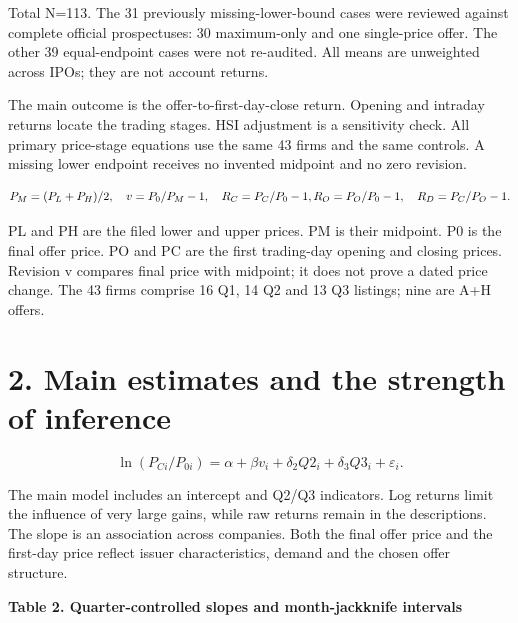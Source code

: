 \documentclass[10pt,a4paper]{article}
\begin{document}
{\footnotesize Total N=113. The 31 previously missing-lower-bound cases were reviewed against complete official prospectuses: 30 maximum-only and one single-price offer. The other 39 equal-endpoint cases were not re-audited. All means are unweighted across IPOs; they are not account returns.}\par

The main outcome is the offer-to-first-day-close return. Opening and intraday returns locate the trading stages. HSI adjustment is a sensitivity check. All primary price-stage equations use the same 43 firms and the same controls. A missing lower endpoint receives no invented midpoint and no zero revision.

\[
P_M=(P_L+P_H)/2,\quad v=P_0/P_M-1,\quad R_C=P_C/P_0-1,\\ R_O=P_O/P_0-1,\quad R_D=P_C/P_O-1.
\]

PL and PH are the filed lower and upper prices. PM is their midpoint. P0 is the final offer price. PO and PC are the first trading-day opening and closing prices. Revision v compares final price with midpoint; it does not prove a dated price change. The 43 firms comprise 16 Q1, 14 Q2 and 13 Q3 listings; nine are A+H offers.

\clearpage

\section*{2. Main estimates and the strength of inference}

\[
\ln(P_{Ci}/P_{0i})=\alpha+\beta v_i+\delta_2 Q2_i+\delta_3 Q3_i+\varepsilon_i.
\]

The main model includes an intercept and Q2/Q3 indicators. Log returns limit the influence of very large gains, while raw returns remain in the descriptions. The slope is an association across companies. Both the final offer price and the first-day price reflect issuer characteristics, demand and the chosen offer structure.

\par\addvspace{5pt}\textbf{Table 2. Quarter-controlled slopes and month-jackknife intervals}\par\nobreak\vspace{2pt}
\end{document}
